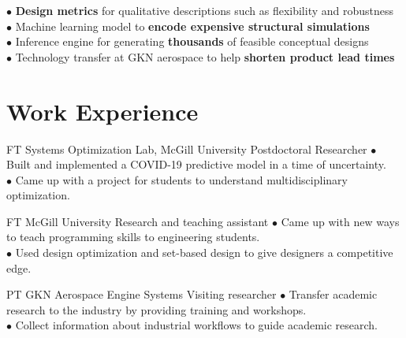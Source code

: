 \documentclass[10pt]{article} %
\begin{document}
$\bullet$ \textbf{Design metrics} for qualitative descriptions such as flexibility and robustness\\[1pt]
$\bullet$ Machine learning model to \textbf{encode expensive structural simulations}\\[1pt]
$\bullet$ Inference engine for generating \textbf{thousands} of feasible conceptual designs\\[1pt]
$\bullet$ Technology transfer at GKN aerospace to help \textbf{shorten product lead times}


\section{Work Experience}





{FT} %
{Systems Optimization Lab, McGill University} %
{Postdoctoral Researcher} %
{
	$\bullet$ Built and implemented a COVID-19 predictive model in a time of uncertainty.\\
	$\bullet$ Came up with a project for students to understand multidisciplinary optimization.
} %


{FT} %
{McGill University} %
{Research and teaching assistant} %
{
	$\bullet$ Came up with new ways to teach programming skills to engineering students.\\
	$\bullet$ Used design optimization and set-based design to give designers a competitive edge.
}  %


{PT} %
{GKN Aerospace Engine Systems} %
{Visiting researcher} %
{
	$\bullet$ Transfer academic research to the industry by providing training and workshops.\\
	$\bullet$ Collect information about industrial workflows to guide academic research.
}  %
\end{document}
